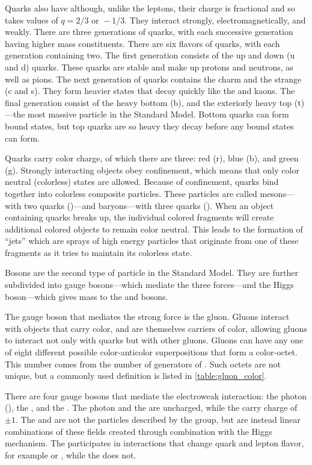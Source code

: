 Quarks also have \spinhalf although, unlike the leptons, their charge is
fractional and so takes values of $q = 2/3 \text{ or } -1/3$. They interact
strongly, electromagnetically, and weakly. There are three generations of
quarks, with each successive generation having higher mass constituents. There
are six flavors of quarks, with each generation containing two. The first
generation consists of the up and down (u and d) quarks. These quarks are
stable and make up protons and neutrons, as well as pions. The next generation
of quarks contains the charm and the strange (c and s). They form heavier
states that decay quickly like the \jpsi and kaons. The final generation
consist of the heavy bottom (b), and the exteriorly heavy top (t)---the most
massive particle in the Standard Model. Bottom quarks can form bound states,
but top quarks are so heavy they decay before any bound states can form.

Quarks carry color charge, of which there are three: red (r), blue (b), and
green (g). Strongly interacting objects obey confinement, which means that only
color neutral (colorless) states are allowed. Because of confinement, quarks
bind together into colorless composite particles. These particles are called
mesons---with two quarks (\qqbar)---and baryons---with three quarks (\baryon).
When an object containing quarks breaks up, the individual colored fragments
will create additional colored objects to remain color neutral. This leads to
the formation of ``jets'' which are sprays of high energy particles that
originate from one of these fragments as it tries to maintain its colorless
state.

Bosons are the second type of particle in the Standard Model. They are further
subdivided into gauge bosons---which mediate the three forces---and the Higgs
boson---which gives mass to the \W and \Z bosons.

The gauge boson that mediates the strong force is the gluon. Gluons interact
with objects that carry color, and are themselves carriers of color, allowing
gluons to interact not only with quarks but with other gluons. Gluons can have
any one of eight different possible color-anticolor superpositions that form a
color-octet. This number comes from the number of generators of \SUthree. Such
octets are not unique, but a commonly used definition is listed in
\cref{table:gluon_color}.



There are four gauge bosons that mediate the electroweak interaction: the photon
(\photon), the \Z, and the \Wpm. The photon and the \Z are uncharged, while the
\Wpm carry charge of $\pm1$. The \W and \Z are not the particles described by
the \SUtwoUone group, but are instead linear combinations of these fields
created through combination with the Higgs mechanism. The \W participates in
interactions that change quark and lepton flavor, for example \ttoWb or
\mutoWnu, while the \Z does not.

